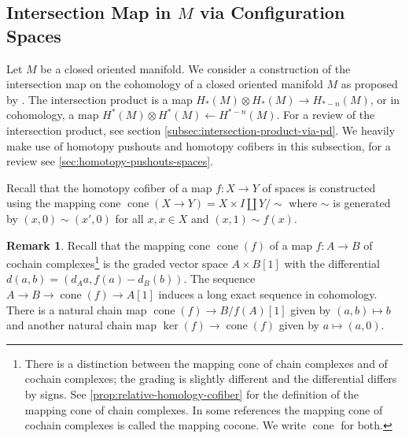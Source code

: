 \documentclass{scrartcl}
\theoremstyle{plain}
\theoremstyle{definition}
\newtheorem{remark}[theorem]{Remark}
\newcommand{\R}{\mathbb R}
\DeclareMathOperator{\cone}{cone}
\newcommand{\from}{\leftarrow}
\renewcommand{\coprod}{\mathbin{\amalg}}
\DeclareMathOperator{\Conf}{Conf}
\DeclareMathOperator{\cConf}{\overline{Conf}}
\begin{document}





\subsection[Intersection Map via Configuration Spaces]{Intersection Map in $M$ via Configuration Spaces}\label{subsec:intersection-in-M-via-conf}

Let $M$ be a closed oriented manifold. We consider a construction of the intersection map on the cohomology of a closed oriented manifold $M$ as proposed by \cite{naef2019string}. The intersection product is a map $H_*(M) \otimes H_*(M) \to H_{*-n}(M)$, or in cohomology, a map $H^*(M) \otimes H^*(M) \from H^{*-n}(M)$. For a review of the intersection product, see section \ref{subsec:intersection-product-via-pd}. We heavily make use of homotopy pushouts and homotopy cofibers in this subsection, for a review see \cref{sec:homotopy-pushouts-spaces}. 

Recall that the homotopy cofiber of a map $f\colon X\to Y$ of spaces is constructed using the mapping cone $\cone(X\to Y) = X\times I\coprod Y / \sim$ where $\sim$ is generated by $(x, 0)\sim (x', 0)$ for all $x, x\in X$ and $(x, 1)\sim f(x)$.

\begin{remark}\label{rmk:cofib-relative-homology}
    Recall that the mapping cone $\cone(f)$ of a map $f\colon A\to B$ of cochain complexes\footnote{There is a distinction between the mapping cone of chain complexes and of cochain complexes; the grading is slightly different and the differential differs by signs. See \cref{prop:relative-homology-cofiber} for the definition of the mapping cone of chain complexes. In some references the mapping cone of cochain complexes is called the mapping cocone. We write $\cone$ for both. } is the graded vector space $A\times B[1]$ with the differential $d(a, b) = (d_A a, f(a) - d_B(b))$. The sequence $A\to B\to \cone(f)\to A[1]$ induces a long exact sequence in cohomology. There is a natural chain map  $\cone(f) \to B/f(A)[1]$ given by $(a,b)\mapsto b$ and another natural chain map $\ker(f)\to \cone(f)$ given by $a\mapsto (a, 0)$. 
\end{remark}
\end{document}
